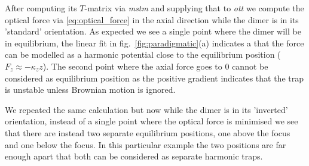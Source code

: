 After computing its $T$-matrix via \textit{mstm} and supplying that 
to \textit{ott} we compute the optical force via \eqref{eq:optical_force} 
in the axial direction while the dimer is in its 'standard' orientation. 
As expected we see a single point where the dimer will be in equilibrium, 
the linear fit in fig.~\ref{fig:paradigmatic}(a) indicates a that the force 
can be modelled as a harmonic potential close to the equilibrium position ($F_z\approx-\kappa_z z$). The second point where the axial 
force goes to 0 cannot be considered as equilibrium position as the positive 
gradient indicates that the trap is unstable unless Brownian motion is ignored. 

We repeated the same calculation but now while the dimer is in its 'inverted' orientation, instead of a single point where the optical force is minimised we 
see that there are instead two separate equilibrium positions, one above the focus
and one below the focus. In this particular example the two positions are far enough
apart that both can be considered as separate harmonic traps.    
